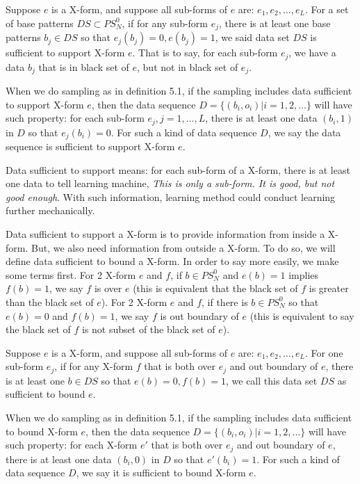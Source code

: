 \begin{definition}
Suppose $e$ is a X-form, and suppose all sub-forms of $e$ are: $e_1, e_2, \ldots, e_L$. For a set of base patterns $DS \subset PS_N^0$, if for any sub-form $e_j$, there is at least one base patterns $b_j \in DS$ so that $e_j(b_j) = 0, e(b_j) = 1$, we said data set $DS$ is sufficient to support X-form $e$. That is to say, for each sub-form $e_j$, we have a data $b_j$ that is in black set of $e$, but not in black set of $e_j$.
\end{definition}
When we do sampling as in definition 5.1, if the sampling includes data sufficient to support X-form $e$, then the data sequence $D = \{(b_i, o_i) |  i =1, 2, \ldots\}$ will have such property: for each sub-form $e_j, j = 1, \ldots, L$, there is at least one data $(b_i, 1)$ in $D$ so that $e_j(b_i) = 0$. For such a kind of data sequence $D$, we say the data sequence is sufficient to support X-form $e$. 




Data sufficient to support means: for each sub-form of a X-form, there is at least one data to tell learning machine, {\it This is only a sub-form. It is good, but not good enough}. With such information, learning method could conduct learning further mechanically. 

Data sufficient to support a X-form is to provide information from inside a X-form. But, we also need information from outside a X-form. To do so, we will define data sufficient to bound a X-form. In order to say more easily, we make some terms first. For 2 X-form $e$ and $f$, if $b \in PS_N^0$ and $e(b) = 1$ implies $f(b) = 1$, we say $f$ is over $e$ (this is equivalent that the black set of $f$ is greater than the black set of $e$). For 2 X-form $e$ and $f$, if there is $b \in PS_N^0$ so that $e(b) = 0$ and $f(b) = 1$, we say $f$ is out boundary of $e$ (this is equivalent to say the black set of $f$ is not subset of the black set of $e$). 


\begin{definition}
Suppose $e$ is a X-form, and suppose all sub-forms of $e$ are: $e_1, e_2, \ldots, e_L$. For one sub-form $e_j$, if for any X-form $f$ that is both over $e_j$ and out boundary of $e$, there is at least one $b \in DS$ so that $e(b) = 0, f(b) = 1$, we call this data set $DS$ as sufficient to bound $e$.   
\end{definition}
When we do sampling as in definition 5.1, if the sampling includes data sufficient to bound X-form $e$, then the data sequence $D = \{(b_i, o_i) |  i =1, 2, \ldots\}$ will have such property: for each X-form $e'$ that is both over $e_j$ and out boundary of $e$, there is at least one data $(b_i, 0)$ in $D$ so that $e'(b_i) = 1$. For such a kind of data sequence $D$, we say it is sufficient to bound X-form $e$. 


